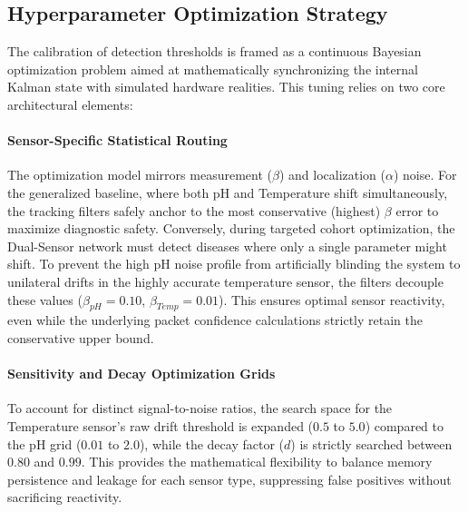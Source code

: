 \documentclass[sigconf]{acmart}
\begin{document}
\subsection{Hyperparameter Optimization Strategy}
The calibration of detection thresholds is framed as a continuous Bayesian optimization problem aimed at mathematically synchronizing the internal Kalman state with simulated hardware realities. This tuning relies on two core architectural elements:

\paragraph{Sensor-Specific Statistical Routing} The optimization model mirrors measurement ($\beta$) and localization ($\alpha$) noise. For the generalized baseline, where both pH and Temperature shift simultaneously, the tracking filters safely anchor to the most conservative (highest) $\beta$ error to maximize diagnostic safety. Conversely, during targeted cohort optimization, the Dual-Sensor network must detect diseases where only a single parameter might shift. To prevent the high pH noise profile from artificially blinding the system to unilateral drifts in the highly accurate temperature sensor, the filters decouple these values ($\beta_{pH} = 0.10$, $\beta_{Temp} = 0.01$). This ensures optimal sensor reactivity, even while the underlying packet confidence calculations strictly retain the conservative upper bound.

\paragraph{Sensitivity and Decay Optimization Grids} To account for distinct signal-to-noise ratios, the search space for the Temperature sensor's raw drift threshold is expanded ($0.5$ to $5.0$) compared to the pH grid ($0.01$ to $2.0$), while the decay factor ($d$) is strictly searched between $0.80$ and $0.99$. This provides the mathematical flexibility to balance memory persistence and leakage for each sensor type, suppressing false positives without sacrificing reactivity.
\end{document}
